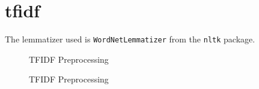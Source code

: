 \section{\ac{tfidf}}\label{sec:impl-tfidf}

The lemmatizer used is \texttt{WordNetLemmatizer} from the \texttt{nltk} package.

\begin{figure}[h] %
    \centering
    
    \caption{TFIDF Preprocessing}
    \label{fig:tfidf_embedding}
\end{figure}

\begin{figure}[htp] %
    \centering
    
    \caption{TFIDF Preprocessing}
    \label{fig:preprocessing}
\end{figure}